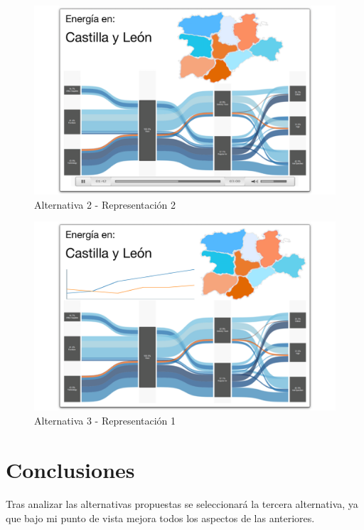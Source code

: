 \documentclass[11pt,spanish]{article}
\begin{document}
			\begin{figure}[H]
				\centering
				\includegraphics[width=130mm]{../res/design4.png}
				\caption{Alternativa 2 - Representación 2 \label{sketch22}}
			\end{figure}

			\begin{figure}[H]
				\centering
				\includegraphics[width=130mm]{../res/design5.png}
				\caption{Alternativa 3  - Representación 1\label{sketch3}}
			\end{figure}
			
	\section{Conclusiones}
			
			\paragraph{}
			Tras analizar las alternativas propuestas se seleccionará la tercera alternativa, ya que bajo mi punto de vista mejora todos los aspectos de las anteriores.
			
\end{document}
